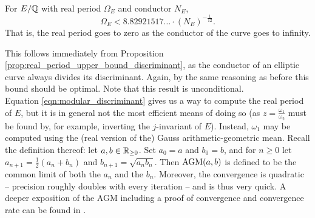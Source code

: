 \begin{corollary}\label{cor:real_period_upper_bound}
For $E/\mathbb{Q}$ with real period $\Omega_E$ and conductor $N_E$,
\begin{equation}
\Omega_E < 8.82921517\ldots \cdot (N_E)^{-\frac{1}{12}}.
\end{equation}
That is, the real period goes to zero as the conductor of the curve goes to infinity.
\end{corollary}
This follows immediately from Proposition \ref{prop:real_period_upper_bound_discriminant}, as the conductor of an elliptic curve always divides its discriminant. Again, by the same reasoning as before this bound should be optimal. Note that this result is unconditional. \\

Equation \ref{eqn:modular_discriminant} gives us a way to compute the real period of $E$, but it is in general not the most efficient means of doing so (as $z = \frac{\omega_1}{\omega_2}$ must be found by, for example, inverting the $j$-invariant of $E$). Instead, $\omega_1$ may be computed using the (real version of the) Gauss arithmetic-geometric mean. Recall the definition thereof: let $a,b \in \mathbb{R}_{\ge0}$. Set $a_0 = a$ and $b_0 = b$, and for $n\ge 0$ let $a_{n+1} = \frac{1}{2}(a_{n}+b_{n})$ and $b_{n+1} = \sqrt{a_{n}b_{n}}$. Then $\text{AGM}(a,b)$ is defined to be the common limit of both the $a_n$ and the $b_n$. Moreover, the convergence is quadratic -- precision roughly doubles with every iteration -- and is thus very quick. A deeper exposition of the AGM including a proof of convergence and convergence rate can be found in \cite{Cox-2000}.

